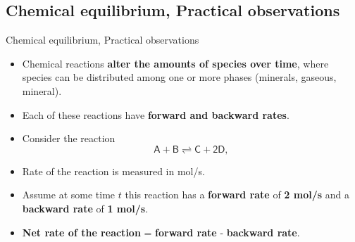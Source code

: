 %
%
\subsection{Chemical equilibrium, Practical observations}
%
\begin{frame}{Chemical equilibrium, Practical observations}
	\vskip 10pt
\begin{itemize}
\item Chemical reactions \textbf{alter the amounts of species over time}, where species can be distributed among one or more phases (minerals, gaseous, mineral).
\pause
\item Each of these reactions have \textbf{forward and backward rates}. 
\pause
\item Consider the reaction
\[
\mathsf{A+B\rightleftharpoons C+2D,}
\]
\pause
\item Rate of the reaction is measured in mol/s.
\pause
\item Assume at some time $t$ this reaction has a \textbf{forward rate}
of \alert{\textbf{2 mol/s}} and a \textbf{backward rate}
of \alert{\textbf{1 mol/s}}.
\pause
\item \alert{\textbf{Net rate of the reaction}} = \textbf{forward rate} - \textbf{backward rate}. 
\end{itemize}
\end{frame}

